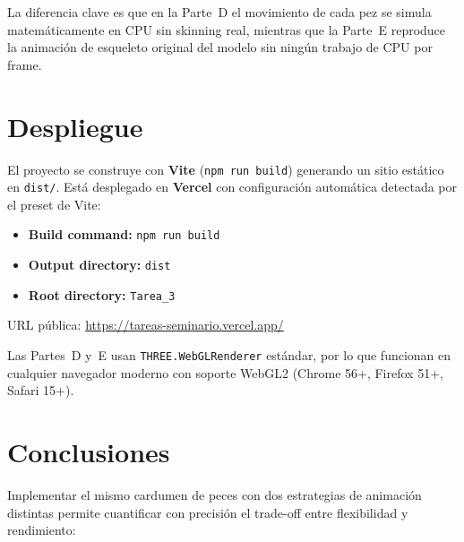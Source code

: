 \documentclass[12pt,a4paper]{article}
\begin{document}
La diferencia clave es que en la Parte~D el movimiento de cada pez se simula
matemáticamente en CPU sin skinning real, mientras que la Parte~E reproduce
la animación de esqueleto original del modelo sin ningún trabajo de CPU por frame.

\section{Despliegue}

El proyecto se construye con \textbf{Vite} (\texttt{npm run build}) generando un
sitio estático en \texttt{dist/}. Está desplegado en \textbf{Vercel} con
configuración automática detectada por el preset de Vite:

\begin{itemize}[leftmargin=*]
  \item \textbf{Build command:} \texttt{npm run build}
  \item \textbf{Output directory:} \texttt{dist}
  \item \textbf{Root directory:} \texttt{Tarea\_3}
\end{itemize}

URL pública: \url{https://tareas-seminario.vercel.app/}

Las Partes~D y~E usan \texttt{THREE.WebGLRenderer} estándar, por lo que funcionan
en cualquier navegador moderno con soporte WebGL2 (Chrome 56+, Firefox 51+, Safari 15+).

\section{Conclusiones}

Implementar el mismo cardumen de peces con dos estrategias de animación distintas
permite cuantificar con precisión el trade-off entre flexibilidad y rendimiento:
\end{document}
